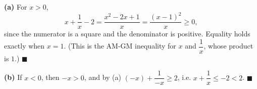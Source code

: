 \textbf{(a)} For $x>0$,
\[x+\dfrac1x-2=\dfrac{x^2-2x+1}{x}=\dfrac{(x-1)^2}{x}\ge0,\]
since the numerator is a square and the denominator is positive. Equality holds exactly when $x=1$. (This is the AM-GM inequality for $x$ and $\dfrac1x$, whose product is $1$.) $\blacksquare$

\textbf{(b)} If $x<0$, then $-x>0$, and by (a) $(-x)+\dfrac{1}{-x}\ge2$, i.e. $x+\dfrac1x\le-2<2$. $\blacksquare$
